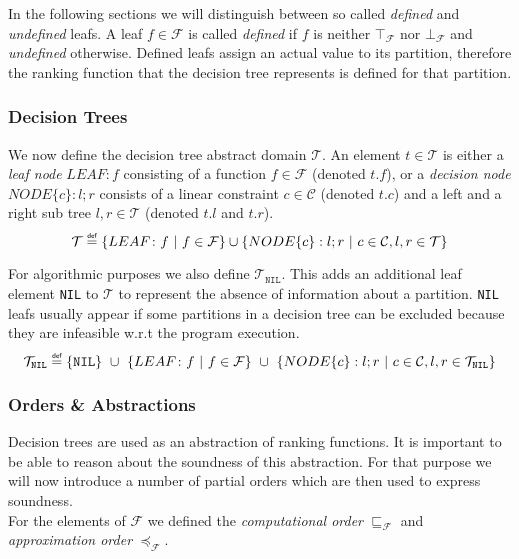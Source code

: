 \documentclass[11pt,a4paper,titlepage]{article}
\theoremstyle{definition}
\newcommand\eqdef{\mathrel{\overset{\makebox[0pt]{\mbox{\normalfont\tiny\sffamily def}}}{=}}}
\begin{document}
In the following sections we will distinguish between so called \textit{defined} and \textit{undefined} leafs. 
A leaf $f \in \mathcal{F}$ is called \textit{defined} if $f$ is neither $\top_{\mathcal{F}}$ nor $\bot_{\mathcal{F}}$  and \textit{undefined} otherwise.
Defined leafs assign an actual value to its partition, therefore the ranking function that the decision tree represents is defined for that partition.


\subsubsection*{Decision Trees}

We now define the decision tree abstract domain $\mathcal{T}$.
An element $t \in \mathcal{T}$ is either a \textit{leaf node} $LEAF \colon f$ consisting of a function $f \in \mathcal{F}$ (denoted $t.f$),
or a \textit{decision node} $NODE\{c\}: l; r$ consists of a linear constraint $c \in \mathcal{C}$ (denoted $t.c$) 
and a left and a right sub tree $l, r \in \mathcal{T}$ 
(denoted $t.l$ and $t.r$).
\[
    \mathcal{T} \eqdef \{LEAF \colon f \ | \ f \in \mathcal{F}\} \cup \{NODE\{c\}: l; r \ | \ c \in \mathcal{C}, l, r \in \mathcal{T} \} 
\]

For algorithmic purposes we also define $\mathcal{T}_{\mathtt{NIL}}$. 
This adds an additional leaf element \texttt{NIL} to $\mathcal{T}$ to represent the absence of information about a partition.
\texttt{NIL} leafs usually appear if some partitions in a decision tree can be excluded because they are infeasible w.r.t the program execution.
\[
    \mathcal{T}_{\mathtt{NIL}} \eqdef \{\mathtt{NIL}\} \ \cup \ \{LEAF \colon f \ | 
    \ f \in \mathcal{F}\} \ \cup \ \{NODE\{c\}: l; r \ | \ c \in \mathcal{C}, l, r \in \mathcal{T}_{\mathtt{NIL}}  \} 
\]


\subsubsection*{Orders \& Abstractions}

Decision trees are used as an abstraction of ranking functions. It is important to be able to reason about the soundness of this abstraction.
For that purpose we will now introduce a number of partial orders which are then used to express soundness.\\

For the elements of $\mathcal{F}$ we defined the \textit{computational order} $\sqsubseteq_{\mathcal{F}}$ 
and \textit{approximation order} $\preceq_{\mathcal{F}}$.
\end{document}

